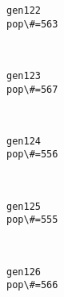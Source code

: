 \documentclass[11pt]{article}
\begin{document}
    \begin{Verbatim}[commandchars=\\\{\}]
gen122
pop\#=563

    \end{Verbatim}

    \begin{center}
    \end{center}
    { \hspace*{\fill} \\}
    
    \begin{Verbatim}[commandchars=\\\{\}]
gen123
pop\#=567

    \end{Verbatim}

    \begin{center}
    \end{center}
    { \hspace*{\fill} \\}
    
    \begin{Verbatim}[commandchars=\\\{\}]
gen124
pop\#=556

    \end{Verbatim}

    \begin{center}
    \end{center}
    { \hspace*{\fill} \\}
    
    \begin{Verbatim}[commandchars=\\\{\}]
gen125
pop\#=555

    \end{Verbatim}

    \begin{center}
    \end{center}
    { \hspace*{\fill} \\}
    
    \begin{Verbatim}[commandchars=\\\{\}]
gen126
pop\#=566

    \end{Verbatim}
\end{document}
